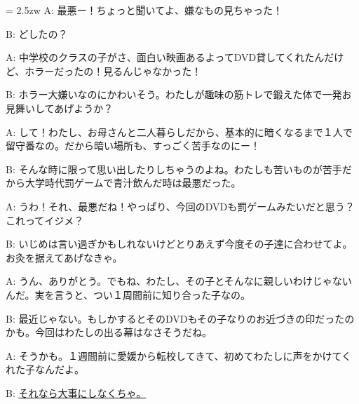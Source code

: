 \documentclass[11pt]{amsart}
\title{}
\author{}
\newenvironment{hangall}[1]{\hangindent = 2.5zw\everypar{\hangindent = 2.5zw}}{}
\begin{document}
\maketitle
\begin{hangall}{}%
A: 最悪ー！ちょっと聞いてよ、嫌なもの見ちゃった！

B: どしたの？

A: 中学校のクラスの子がさ、面白い映画あるよってDVD貸してくれたんだけど、ホラーだったの！見るんじゃなかった！

B: ホラー大嫌いなのにかわいそう。わたしが趣味の筋トレで鍛えた体で一発お見舞いしてあげようか？

A: して！わたし、お母さんと二人暮らしだから、基本的に暗くなるまで１人で留守番なの。だから暗い場所も、すっごく苦手なのにー！

B: そんな時に限って思い出したりしちゃうのよね。わたしも苦いものが苦手だから大学時代罰ゲームで青汁飲んだ時は最悪だった。

A: うわ！それ、最悪だね！やっぱり、今回のDVDも罰ゲームみたいだと思う？これってイジメ？

B: いじめは言い過ぎかもしれないけどとりあえず今度その子達に合わせてよ。お灸を据えてあげなきゃ。

A: うん、ありがとう。でもね、わたし、その子とそんなに親しいわけじゃないんだ。実を言うと、つい１周間前に知り合った子なの。

B: 最近じゃない。もしかするとそのDVDもその子なりのお近づきの印だったのかも。今回はわたしの出る幕はなさそうだね。

A: そうかも。１週間前に愛媛から転校してきて、初めてわたしに声をかけてくれた子なんだよ。

B: \ul{それなら大事にしなくちゃ。}\end{hangall}
\end{document}
